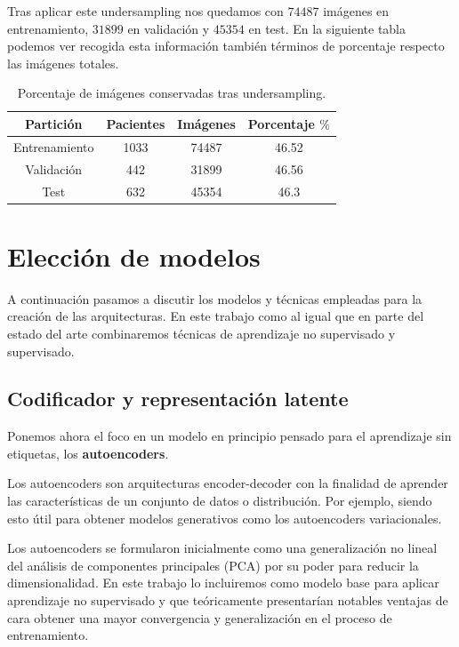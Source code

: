 Tras aplicar este undersampling nos quedamos con $74487$ imágenes en entrenamiento, $31899$ en validación y $45354$ en test. En la siguiente tabla podemos ver recogida esta información también términos de porcentaje respecto las imágenes totales.

\begin{table}[H]
	\centering
	\begin{tabular}{|c|c|c|c|}
		\hline
		\textbf{Partición} & \textbf{Pacientes} & \textbf{Imágenes} & \textbf{Porcentaje $\%$} \\ \hline
		Entrenamiento & 1033 & 74487 &  46.52 \\ \hline
		Validación & 442 & 31899 & 46.56 \\ \hline
		Test & 632 & 45354 &  46.3\\ \hline
	\end{tabular}
	\caption{Porcentaje de imágenes conservadas tras undersampling.}
\end{table}


\section{Elección de modelos}

A continuación pasamos a discutir los modelos y técnicas empleadas para la creación de las arquitecturas. En este trabajo como al igual que en parte del estado del arte combinaremos técnicas de aprendizaje no supervisado y supervisado.

\subsection{Codificador y representación latente}

Ponemos ahora el foco en un modelo en principio pensado para el aprendizaje sin etiquetas, los \textbf{autoencoders}.

Los autoencoders son arquitecturas encoder-decoder con la finalidad de aprender las características de un conjunto de datos o distribución. Por ejemplo, siendo esto útil para obtener modelos generativos como los autoencoders variacionales. 

Los autoencoders se formularon inicialmente como una generalización no lineal del análisis de componentes principales (PCA) por su poder para reducir la dimensionalidad. En este trabajo lo incluiremos como modelo base para aplicar aprendizaje no supervisado y que teóricamente presentarían notables ventajas de cara obtener una mayor convergencia y generalización en el proceso de entrenamiento. 

